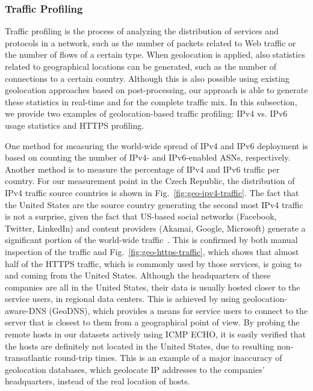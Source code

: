 \subsubsection{Traffic Profiling}

Traffic profiling is the process of analyzing the distribution of services and protocols in a network, such as the number of packets related to Web traffic or the number of flows of a certain type. When geolocation is applied, also statistics related to geographical locations can be generated, such as the number of connections to a certain country. Although this is also possible using existing geolocation approaches based on post-processing, our approach is able to generate these statistics in real-time and for the complete traffic mix. In this subsection, we provide two examples of geolocation-based traffic profiling: IPv4 vs. IPv6 usage statistics and HTTPS profiling.

One method for measuring the world-wide spread of IPv4 and IPv6 deployment is based on counting the number of IPv4- and IPv6-enabled ASNs, respectively. Another method is to measure the percentage of IPv4 and IPv6 traffic per country. For our measurement point in the Czech Republic, the distribution of IPv4 traffic source countries is shown in Fig.~\ref{fig:geo-ipv4-traffic}. The fact that the United States are the source country generating the second most IPv4 traffic is not a surprise, given the fact that US-based social networks (Facebook, Twitter, LinkedIn) and content providers (Akamai, Google, Microsoft) generate a significant portion of the world-wide traffic~\cite{Gehlen-2012-Uncovering}. This is confirmed by both manual inspection of the traffic and Fig.~\ref{fig:geo-https-traffic}, which shows that almost half of the HTTPS traffic, which is commonly used by those services, is going to and coming from the United States. Although the headquarters of these companies are all in the United States, their data is usually hosted closer to the service users, in regional data centers. This is achieved by using geolocation-aware-DNS (GeoDNS), which provides a means for service users to connect to the server that is closest to them from a geographical point of view. By probing the remote hosts in our datasets actively using ICMP ECHO, it is easily verified that the hosts are definitely not located in the United States, due to resulting non-transatlantic round-trip times. This is an example of a major inaccuracy of geolocation databases, which geolocate IP addresses to the companies' headquarters, instead of the real location of hosts.

